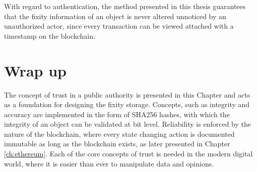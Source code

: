 With regard to authentication, the method presented in this thesis guarantees that the fixity information of an object is never altered unnoticed by an unauthorized actor, since every transaction can be viewed attached with a timestamp on the blockchain.

\section{Wrap up}
The concept of trust in a public authority is presented in this Chapter and acts as a foundation for designing the fixity storage. Concepts, such as integrity and accuracy are implemented in the form of SHA256 hashes, with which the integrity of an object can be validated at bit level. Reliability is enforced by the nature of the blockchain, where every state changing action is documented immutable as long as the blockchain exists, as later presented in Chapter \ref{ch:ethereum}. Each of the core concepts of trust is needed in the modern digital world, where it is easier than ever to manipulate data and opinions.